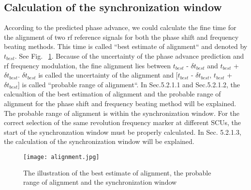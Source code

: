 \subsection{Calculation of the synchronization window}
According to the predicted phase advance, we could calculate the fine time for the alignment of two rf reference signals for both the phase shift and frequency beating methods. This time is called ``best estimate of alignment`` and denoted by $t_{best}$. See Fig. ~\ref{alignment}. Because of the uncertainty of the phase advance prediction and rf frequency modulation, the fine alignment lies between $t_{best}$ - $\delta t_{best}$ and $t_{best}$ + $\delta t_{best}$. $\delta t_{best}$ is called the uncertainty of the alignment and [$t_{best}$ - $\delta t_{best}$, $t_{best}$ + $\delta t_{best}$] is called ``probable range of alignment``. In Sec.5.2.1.1 and Sec.5.2.1.2, the calcualtion of the best estimation of alignment and the probable range of alignment for the phase shift and frequency beating method will be explained. The probable range of alignment is within the synchronization window. For the correct selection of the same revolution frequency marker at different SCUs, the start of the synchronzation window must be properly calculated. In Sec. 5.2.1.3, the calculation of the synchronization window will be explained. 
\begin{figure}[!htb]
   \centering   
   \texttt{[image: alignment.jpg]}
   \caption{The illustration of the best estimate of alignment, the probable range of alignment and the synchronization window}
   \label{alignment}
\end{figure}


